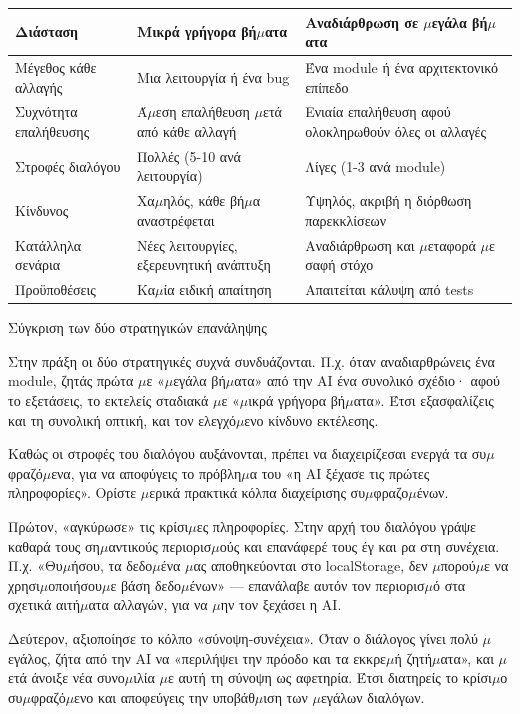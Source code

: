 \begin{center}
\begin{tabularx}{\linewidth}{|X|X|X|}
\hline
\textbf{Διάσταση} & \textbf{Μικρά γρήγορα βή$\mu$ατα} & \textbf{Αναδιάρθρωση σε $\mu$εγάλα βή$\mu$ατα} \tabularnewline
\hline
Μέγεθος κάθε αλλαγής & Μια λειτουργία ή ένα bug & Ένα module ή ένα αρχιτεκτονικό επίπεδο \tabularnewline
Συχνότητα επαλήθευσης & Ά$\mu$εση επαλήθευση $\mu$ετά από κάθε αλλαγή & Ενιαία επαλήθευση αφού ολοκληρωθούν όλες οι αλλαγές \tabularnewline
Στροφές διαλόγου & Πολλές (5-10 ανά λειτουργία) & Λίγες (1-3 ανά module) \tabularnewline
Κίνδυνος & Χα$\mu$ηλός, κάθε βή$\mu$α αναστρέφεται & Υψηλός, ακριβή η διόρθωση παρεκκλίσεων \tabularnewline
Κατάλληλα σενάρια & Νέες λειτουργίες, εξερευνητική ανάπτυξη & Αναδιάρθρωση και $\mu$εταφορά $\mu$ε σαφή στόχο \tabularnewline
Προϋποθέσεις & Κα$\mu$ία ειδική απαίτηση & Απαιτείται κάλυψη από tests \tabularnewline
\hline
\end{tabularx}
\end{center}

\begin{center}\small\color{gray}Σύγκριση των δύο στρατηγικών επανάληψης\end{center}

Στην πράξη οι δύο στρατηγικές συχνά συνδυάζονται. Π.χ. όταν αναδιαρθρώνεις ένα module, ζητάς πρώτα $\mu$ε «$\mu$εγάλα βή$\mu$ατα» από την AI ένα συνολικό σχέδιο· αφού το εξετάσεις, το εκτελείς σταδιακά $\mu$ε «$\mu$ικρά γρήγορα βή$\mu$ατα». Έτσι εξασφαλίζεις και τη συνολική οπτική, και τον ελεγχό$\mu$ενο κίνδυνο εκτέλεσης.


Καθώς οι στροφές του διαλόγου αυξάνονται, πρέπει να διαχειρίζεσαι ενεργά τα συ$\mu$φραζό$\mu$ενα, για να αποφύγεις το πρόβλη$\mu$α του «η AI ξέχασε τις πρώτες πληροφορίες». Ορίστε $\mu$ερικά πρακτικά κόλπα διαχείρισης συ$\mu$φραζο$\mu$ένων.

Πρώτον, «αγκύρωσε» τις κρίσι$\mu$ες πληροφορίες. Στην αρχή του διαλόγου γράψε καθαρά τους ση$\mu$αντικούς περιορισ$\mu$ούς και επανάφερέ τους έγ και ρα στη συνέχεια. Π.χ. «Θυ$\mu$ήσου, τα δεδο$\mu$ένα $\mu$ας αποθηκεύονται στο localStorage, δεν $\mu$πορού$\mu$ε να χρησι$\mu$οποιήσου$\mu$ε βάση δεδο$\mu$ένων» — επανάλαβε αυτόν τον περιορισ$\mu$ό στα σχετικά αιτή$\mu$ατα αλλαγών, για να $\mu$ην τον ξεχάσει η AI.

Δεύτερον, αξιοποίησε το κόλπο «σύνοψη-συνέχεια». Όταν ο διάλογος γίνει πολύ $\mu$εγάλος, ζήτα από την AI να «περιλήψει την πρόοδο και τα εκκρε$\mu$ή ζητή$\mu$ατα», και $\mu$ετά άνοιξε νέα συνο$\mu$ιλία $\mu$ε αυτή τη σύνοψη ως αφετηρία. Έτσι διατηρείς το κρίσι$\mu$ο συ$\mu$φραζό$\mu$ενο και αποφεύγεις την υποβάθ$\mu$ιση των $\mu$εγάλων διαλόγων.

